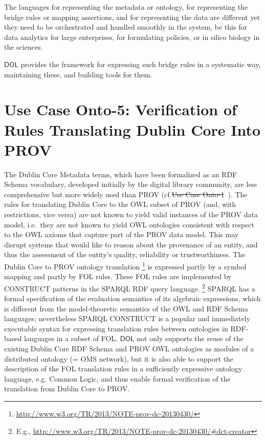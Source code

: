 \documentclass[10pt,fleqn,final]{scrreprt}
\newcommand*{\DOL}{\ensuremath{\mathsf{DOL}}\xspace}
\providecommand{\DIFadd}[1]{{\protect\color{blue}\uwave{#1}}} %
\providecommand{\DIFdel}[1]{{\protect\color{red}\sout{#1}}}                      %
\providecommand{\DIFaddbegin}{} %
\providecommand{\DIFaddend}{} %
\providecommand{\DIFdelbegin}{} %
\providecommand{\DIFdelend}{} %
\begin{document}
The languages for representing the metadata or ontology, for representing the bridge rules or mapping assertions, and for representing the data are different yet 
they need to be orchestrated and handled smoothly in the system, be this for data analytics for large enterprises, for formulating policies, or in silico biology in the 
sciences. 

\DOL  provides the framework for expressing such bridge rules in a systematic way, maintaining these, and building tools for them. 


\section{Use Case Onto-5: Verification of Rules Translating Dublin Core Into PROV}
The Dublin Core Metadata terms, which have been formalized as an RDF Schema vocabulary, developed initially by the digital library community, are less 
comprehensive but more widely used than PROV (cf.\DIFdelbegin \DIFdel{Use Case Onto-1}\DIFdelend \DIFaddbegin \ \DIFadd{subclause~\ref{onto-1}}\DIFaddend ). The rules for translating Dublin Core to the OWL subset of PROV (and, with restrictions, 
vice versa) are not known to yield valid instances of the PROV data model, i.e.\ they are not known to yield OWL ontologies consistent with respect to the OWL axioms that 
capture part of the PROV data model. This may disrupt systems that would like to reason about the provenance of an entity, and thus the assessment of the 
entity's quality, reliability or trustworthiness.
The Dublin Core to PROV ontology translation%
\footnote{\url{http://www.w3.org/TR/2013/NOTE-prov-dc-20130430/}}
  is expressed partly by a symbol mapping and partly by FOL rules. These FOL rules are implemented by CONSTRUCT patterns in the SPARQL RDF query language.%
\footnote{E.g., \url{http://www.w3.org/TR/2013/NOTE-prov-dc-20130430/\#dct-creator}} 
SPARQL has a formal specification of the evaluation semantics of its algebraic expressions, which 
 is different from the model-theoretic semantics of the OWL and RDF Schema languages; nevertheless 
SPARQL CONSTRUCT is a popular and immediately executable syntax for expressing translation rules 
 between ontologies in RDF-based languages in a subset of FOL.
\DOL  not only supports the reuse of the existing Dublin Core RDF Schema and PROV OWL ontologies as 
 modules of a distributed ontology (= OMS network), but it is also able to support the description 
of the FOL translation rules in a sufficiently expressive ontology language, e.g. Common Logic, 
and thus enable formal verification of the translation from Dublin Core to PROV.
\end{document}
